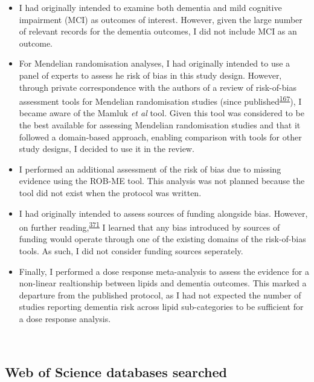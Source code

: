 \documentclass[a4paper, twoside]{templates/ociamthesis}
\begin{document}
\begin{itemize}
\item
  I had originally intended to examine both dementia and mild cognitive impairment (MCI) as outcomes of interest. However, given the large number of relevant records for the dementia outcomes, I did not include MCI as an outcome.
\item
  For Mendelian randomisation analyses, I had originally intended to use a panel of experts to assess he risk of bias in this study design. However, through private correspondence with the authors of a review of risk-of-bias assessment tools for Mendelian randomisation studies (since published\textsuperscript{\protect\hyperlink{ref-spiga2021}{167}}), I became aware of the Mamluk \emph{et al} tool. Given this tool was considered to be the best available for assessing Mendelian randomisation studies and that it followed a domain-based approach, enabling comparison with tools for other study designs, I decided to use it in the review.
\item
  I performed an additional assessment of the risk of bias due to missing evidence using the ROB-ME tool. This analysis was not planned because the tool did not exist when the protocol was written.
\item
  I had originally intended to assess sources of funding alongside bias. However, on further reading,\textsuperscript{\protect\hyperlink{ref-sterne2013}{371}} I learned that any bias introduced by sources of funding would operate through one of the existing domains of the risk-of-bias tools. As such, I did not consider funding sources seperately.
\item
  Finally, I performed a dose response meta-analysis to assess the evidence for a non-linear realtionship between lipids and dementia outcomes. This marked a departure from the published protocol, as I had not expected the number of studies reporting dementia risk across lipid sub-categories to be sufficient for a dose response analysis.
\end{itemize}

~

\hypertarget{appendix-wos-databases}{%
\subsection{Web of Science databases searched}\label{appendix-wos-databases}}
\end{document}
